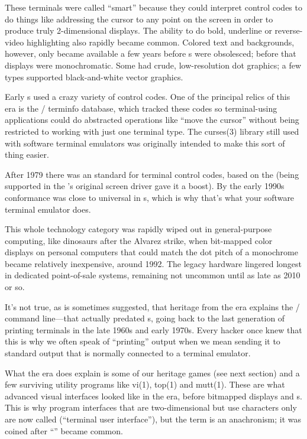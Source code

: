 These terminals were called ``smart'' because they could interpret control codes
to do things like addressing the cursor to any point on the screen in order to
produce truly 2-dimensional displays. The ability to do bold, underline or
reverse-video highlighting also rapidly became common. Colored text and
backgrounds, however, only became available a few years before s were
obsolesced; before that displays were monochromatic. Some had crude,
low-resolution dot graphics; a few types supported black-and-white vector
graphics.

Early s used a crazy variety of control codes. One of the principal relics
of this era is the \UNIX/ terminfo database, which tracked these codes so
terminal-using applications could do abstracted operations like ``move the
cursor'' without being restricted to working with just one terminal type. The
curses(3) library still used with software terminal emulators was originally
intended to make this sort of thing easier.

After 1979 there was an  standard for terminal control codes, based on the
 (being supported in the 's original screen driver gave it a
boost). By the early 1990s  conformance was close to universal in s,
which is why that's what your software terminal emulator does.

This whole technology category was rapidly wiped out in general-purpose
computing, like dinosaurs after the Alvarez strike, when bit-mapped color
displays on personal computers that could match the dot pitch of a monochrome
 became relatively inexpensive, around 1992. The legacy  hardware
lingered longest in dedicated point-of-sale systems, remaining not uncommon
until as late as 2010 or so.

It's not true, as is sometimes suggested, that heritage from the  era
explains the \UNIX/ command line---that actually predated s, going back to the
last generation of printing terminals in the late 1960s and early 1970s. Every
hacker once knew that this is why we often speak of ``printing'' output when we
mean sending it to standard output that is normally connected to a terminal
emulator.

What the  era does explain is some of our heritage games (see next section)
and a few surviving utility programs like vi(1), top(1) and mutt(1). These are
what advanced visual interfaces looked like in the  era, before bitmapped
displays and s. This is why program interfaces that are two-dimensional but
use characters only are now called  (``terminal user interface''), but the
term is an anachronism; it was coined after ``'' became common.

